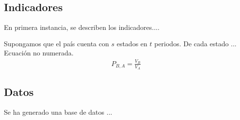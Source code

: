 \documentclass[11pt]{article}
\begin{document}
\subsection{Indicadores}

En primera instancia, se describen los indicadores....

Supongamos que el país cuenta con $s$ estados en $t$ periodos. De cada estado ... Ecuación no numerada.
%
\begin{eqnarray*}
P_{B, A} = \frac{V_B}{V_A}
\end{eqnarray*} \vspace*{0cm}
 
 

\subsection{Datos}

Se ha generado una base de datos ...
\end{document}
